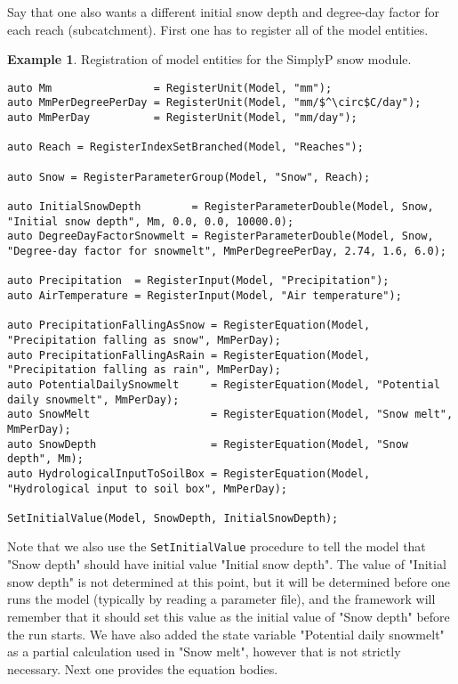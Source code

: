 \documentclass[11pt]{article}
\theoremstyle{definition}
\newtheorem{myexample}{Example}
\newenvironment{example}%
  {\begin{lrbox}{\examplebox}%
   \begin{minipage}{\dimexpr\linewidth-2\fboxsep}
   \begin{myexample}}%
  {\end{myexample}%
   \end{minipage}%
   \end{lrbox}%
   \begin{trivlist}
     \item[]\colorbox{silver}{\usebox\examplebox}
   \end{trivlist}}
\begin{document}
Say that one also wants a different initial snow depth and degree-day factor for each reach (subcatchment). First one has to register all of the model entities.
\begin{example}
Registration of model entities for the SimplyP snow module.
\begin{lstlisting}[style=mycpp,mathescape]
auto Mm                = RegisterUnit(Model, "mm");
auto MmPerDegreePerDay = RegisterUnit(Model, "mm/$^\circ$C/day");
auto MmPerDay          = RegisterUnit(Model, "mm/day");

auto Reach = RegisterIndexSetBranched(Model, "Reaches");

auto Snow = RegisterParameterGroup(Model, "Snow", Reach);

auto InitialSnowDepth        = RegisterParameterDouble(Model, Snow, "Initial snow depth", Mm, 0.0, 0.0, 10000.0);
auto DegreeDayFactorSnowmelt = RegisterParameterDouble(Model, Snow, "Degree-day factor for snowmelt", MmPerDegreePerDay, 2.74, 1.6, 6.0);

auto Precipitation  = RegisterInput(Model, "Precipitation");
auto AirTemperature = RegisterInput(Model, "Air temperature");

auto PrecipitationFallingAsSnow = RegisterEquation(Model, "Precipitation falling as snow", MmPerDay);
auto PrecipitationFallingAsRain = RegisterEquation(Model, "Precipitation falling as rain", MmPerDay);
auto PotentialDailySnowmelt     = RegisterEquation(Model, "Potential daily snowmelt", MmPerDay);
auto SnowMelt                   = RegisterEquation(Model, "Snow melt", MmPerDay);
auto SnowDepth                  = RegisterEquation(Model, "Snow depth", Mm);
auto HydrologicalInputToSoilBox = RegisterEquation(Model, "Hydrological input to soil box", MmPerDay);

SetInitialValue(Model, SnowDepth, InitialSnowDepth);
\end{lstlisting}
\end{example}

Note that we also use the {\tt SetInitialValue} procedure to tell the model that "Snow depth" should have initial value "Initial snow depth". The value of "Initial snow depth" is not determined at this point, but it will be determined before one runs the model (typically by reading a parameter file), and the framework will remember that it should set this value as the initial value of "Snow depth" before the run starts. We have also added the state variable "Potential daily snowmelt" as a partial calculation used in "Snow melt", however that is not strictly necessary. Next one provides the equation bodies.
\end{document}

